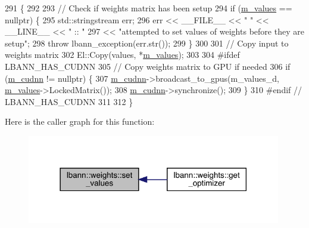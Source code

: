 \begin{DoxyCode}
291                                                  \{
292 
293   \textcolor{comment}{// Check if weights matrix has been setup}
294   \textcolor{keywordflow}{if} (\hyperlink{classlbann_1_1weights_a6b2df671b6d4c4dd595477971eea0543}{m\_values} == \textcolor{keyword}{nullptr}) \{
295     std::stringstream err;
296     err << \_\_FILE\_\_ << \textcolor{stringliteral}{" "} << \_\_LINE\_\_ << \textcolor{stringliteral}{" :: "}
297         << \textcolor{stringliteral}{"attempted to set values of weights before they are setup"};
298     \textcolor{keywordflow}{throw} lbann\_exception(err.str());
299   \}
300 
301   \textcolor{comment}{// Copy input to weights matrix}
302   El::Copy(values, *\hyperlink{classlbann_1_1weights_a6b2df671b6d4c4dd595477971eea0543}{m\_values});
303 
304 \textcolor{preprocessor}{  #ifdef LBANN\_HAS\_CUDNN}
305   \textcolor{comment}{// Copy weights matrix to GPU if needed}
306   \textcolor{keywordflow}{if} (\hyperlink{classlbann_1_1weights_a873e8c14998915e442d03b8dd7d2fdf7}{m\_cudnn} != \textcolor{keyword}{nullptr}) \{
307     \hyperlink{classlbann_1_1weights_a873e8c14998915e442d03b8dd7d2fdf7}{m\_cudnn}->broadcast\_to\_gpus(m\_values\_d, \hyperlink{classlbann_1_1weights_a6b2df671b6d4c4dd595477971eea0543}{m\_values}->LockedMatrix());
308     \hyperlink{classlbann_1_1weights_a873e8c14998915e442d03b8dd7d2fdf7}{m\_cudnn}->synchronize();
309   \}
310 \textcolor{preprocessor}{  #endif // LBANN\_HAS\_CUDNN}
311 
312 \}
\end{DoxyCode}
Here is the caller graph for this function\+:\nopagebreak
\begin{figure}[H]
\begin{center}
\leavevmode
\includegraphics[width=314pt]{classlbann_1_1weights_ae10da5d92c9402ced7e55f04fbd05a2e_icgraph}
\end{center}
\end{figure}
\mbox{\label{classlbann_1_1weights_a476989a30cbe62ab2f680235981c3ba5}} 
